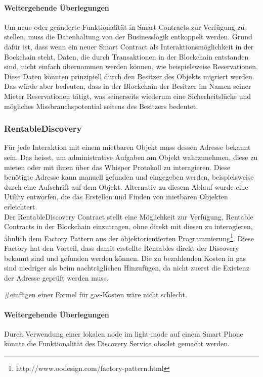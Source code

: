 \paragraph{Weitergehende Überlegungen}
Um neue oder geänderte Funktionalität in Smart Contracts zur Verfügung zu stellen, muss die Datenhaltung von der Businesslogik entkoppelt werden. Grund dafür ist, dass wenn ein neuer Smart Contract als Interaktionsmöglichkeit in der Bockchain steht, Daten, die durch Transaktionen in der Blockchain entstanden sind, nicht einfach übernommen werden können, wie beispielsweise Reservationen. Diese Daten könnten prinzipiell durch den Besitzer des Objekts migriert werden. Das würde aber bedeuten, dass in der Blockchain der Besitzer im Namen seiner Mieter Reservationen tätigt, was seinerseits wiederum eine Sicherheitslücke und mögliches Missbrauchspotential seitens des Besitzers bedeutet.

\subsubsection{RentableDiscovery}
Für jede Interaktion mit einem mietbaren Objekt muss dessen Adresse bekannt sein. Das heisst, um administrative Aufgaben am Objekt wahrzunehmen, diese zu mieten oder mit ihnen über das Whisper Protokoll zu interagieren. Diese benötigte Adresse kann manuell gefunden und eingegeben werden, beispielsweise durch eine Aufschrift auf dem Objekt. Alternativ zu diesem Ablauf wurde eine Utility entworfen, die das Erstellen und Finden von mietbaren Objekten erleichtert.
\\Der RentableDiscovery Contract stellt eine Möglichkeit zur Verfügung, Rentable Contracts in der Blockchain einzutragen, ohne direkt mit diesen zu interagieren, ähnlich dem Factory Pattern aus der objektorientierten Programmierung\footnote{http://www.oodesign.com/factory-pattern.html}. Diese Factory hat den Vorteil, dass damit erstellte Rentables direkt der Discovery bekannt sind und gefunden werden können. Die zu bezahlenden Kosten in gas sind niedriger als beim nachträglichen Hinzufügen, da nicht zuerst die Existenz der Adresse geprüft werden muss.

\#einfügen einer Formel für gas-Kosten wäre nicht schlecht.

\paragraph{Weitergehende Überlegungen}
Durch Verwendung einer lokalen node im light-mode auf einem Smart Phone könnte die Funktionalität des Discovery Service obsolet gemacht werden.

